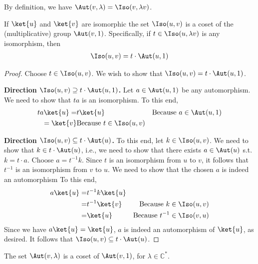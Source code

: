 By definition, we have $\Aut(v,\lambda)=\Iso(v,\lambda v)$.
\begin{lemma}
	\label{thm:isomorphisms-form-coset}
	If $\ket{u}$ and $\ket{v}$ are isomorphic the set $\Iso(u,v)$ is a coset of the (multiplicative) group $\Aut(v,1)$.
	Specifically, if $t\in \Iso(u,\lambda v)$ is any isomorphism, then
	\begin{align}
		\Iso(u,v)=t\cdot \Aut(u,1)
	\end{align}
\end{lemma}
\begin{proof}
	Choose $t\in \Iso(u,v)$.
	We wish to show that $\Iso(u,v)=t\cdot \Aut(u,1)$.
	
	
	\textbf{Direction $\Iso(u,v)\supseteq t\cdot \Aut(u,1)$.}
	Let $a\in \Aut(u,1)$ be any automorphism.
	We need to show that $ta$ is an isomorphism.
	To this end,
	\begin{align}
		ta\ket{u} = & t\ket{u} & \text{Because }a\in \Aut(u,1) \\
		=\ket{v} & \text{Because }t\in \Iso(u,v)
	\end{align}
	
	\textbf{Direction $\Iso(u,v)\subseteq t\cdot \Aut(u)$.}
	To this end, let $k\in \Iso(u,v)$.
	We need to show that $k\in t\cdot \Aut(u)$, i.e., we need to show that there exists $a\in \Aut(u)$ s.t. $k=t\cdot a$.
	Choose $a=t^{-1}k$.
	Since $t$ is an isomorphism from $u$ to $v$, it follows that $t^{-1}$ is an isomorphism from $v$ to $u$.
	We need to show that the chosen $a$ is indeed an automorphism
	To this end,
	\begin{align}
		a\ket{u} = & t^{-1}k\ket{u} &  \\
		= & t^{-1}\ket{v} & \text{Because }k\in \Iso(u,v) \\
		= & \ket{u} & \text{Because }t^{-1}\in \Iso(v,u)
	\end{align}
	Since we have $a\ket{u}=\ket{u}$, $a$ is indeed an automorphism of $\ket{u}$, as desired.
	It follows that $\Iso(u,v)\subseteq t\cdot \Aut(u)$.
\end{proof}
\begin{corollary}
	The set $\Aut(v,\lambda)$ is a coset of $\Aut(v,1)$, for $\lambda\in\mathbb C^\ast$.
\end{corollary}

